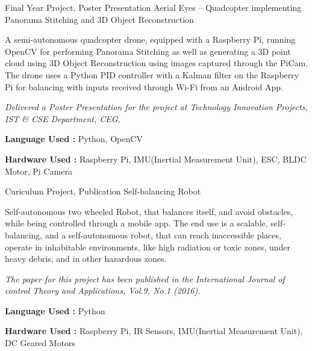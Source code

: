 

\begin{cventries}

  \cventry
    {Final Year Project, Poster Presentation} %
    {Aerial Eyes – Quadcopter implementing Panorama Stitching and 3D Object Reconstruction} %
    {} %
    {} %
    {
      \begin{cvitems}
      \item{A semi-autonomous quadcopter drone, equipped with a Raspberry Pi, running OpenCV for performing Panorama Stitching as well as generating a 3D point cloud using 3D Object Reconstruction using images captured through the PiCam. The drone uses a Python PID controller with a Kalman filter on the Raspberry Pi for balancing with inputs received through Wi-Fi from an Android App. }
      \item{\textit{Delivered a Poster Presentation for the project at Technology Innovation Projects, IST \& CSE Department, CEG.}}
      \item{\textbf{Language Used :} Python, OpenCV}
      \item{\textbf{Hardware Used :} Raspberry Pi, IMU(Inertial Measurement Unit), ESC, BLDC Motor, Pi Camera}
      \end{cvitems}
    }

  \cventry
    {Curiculum Project, Publication} %
    {Self-balancing Robot} %
    {} %
    {} %
    {
      \begin{cvitems}
      \item{Self-autonomous two wheeled Robot, that balances itself, and avoid obstacles, while being controlled through a mobile app. The end use is a scalable, self-balancing, and a self-autonomous robot, that can reach inaccessible places, operate in inhabitable environments, like high radiation or toxic zones, under heavy debris, and in other hazardous zones.}
      \item{\textit{The paper for this project has been published in the International Journal of control Theory and Applications, Vol.9, No.1 (2016).}}
      \item{\textbf{Language Used :} Python}
      \item{\textbf{Hardware Used :} Raspberry Pi, IR Sensors, IMU(Inertial Measurement Unit), DC Geared Motors}
      \end{cvitems}
    }


\end{cventries}
